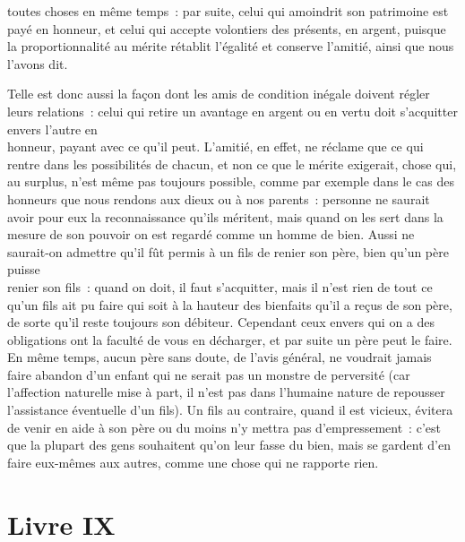 \documentclass[french,twoside]{book} %
\begin{document}
toutes choses en même temps : par suite, celui qui amoindrit son patrimoine est payé en honneur, et celui qui accepte volontiers des présents, en argent, puisque la proportionnalité au mérite rétablit l’égalité et conserve l’amitié, ainsi que nous l’avons dit.\par
Telle est donc aussi la façon dont les amis de condition inégale doivent régler leurs relations : celui qui retire un avantage en argent ou en vertu doit s’acquitter envers l’autre en \\
honneur, payant avec ce qu’il peut. L’amitié, en effet, ne réclame que ce qui rentre dans les possibilités de chacun, et non ce que le mérite exigerait, chose qui, au surplus, n’est même pas toujours possible, comme par exemple dans le cas des honneurs que nous rendons aux dieux ou à nos parents : personne ne saurait avoir pour eux la reconnaissance qu’ils méritent, mais quand on les sert dans la mesure de son pouvoir on est regardé comme un homme de bien. Aussi ne saurait-on admettre qu’il fût permis à un fils de renier son père, bien qu’un père puisse \\
renier son fils : quand on doit, il faut s’acquitter, mais il n’est rien de tout ce qu’un fils ait pu faire qui soit à la hauteur des bienfaits qu’il a reçus de son père, de sorte qu’il reste toujours son débiteur. Cependant ceux envers qui on a des obligations ont la faculté de vous en décharger, et par suite un père peut le faire. En même temps, aucun père sans doute, de l’avis général, ne voudrait jamais faire abandon d’un enfant qui ne serait pas un monstre de perversité (car l’affection naturelle mise à part, il n’est pas dans l’humaine nature de repousser \\
l’assistance éventuelle d’un fils). Un fils au contraire, quand il est vicieux, évitera de venir en aide à son père ou du moins n’y mettra pas d’empressement : c’est que la plupart des gens souhaitent qu’on leur fasse du bien, mais se gardent d’en faire eux-mêmes aux autres, comme une chose qui ne rapporte rien.
\section[{Livre IX}]{Livre IX}\renewcommand{\leftmark}{Livre IX}
\end{document}
